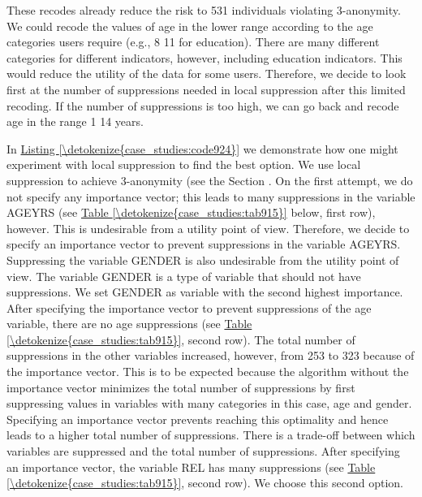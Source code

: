 \documentclass[letterpaper,10pt,english]{sphinxmanual}
\begin{document}
These recodes already reduce the risk to 531 individuals violating
3-anonymity. We could recode the values of age in the lower range
according to the age categories users require (e.g., 8 \textendash{} 11 for
education). There are many different categories for different
indicators, however, including education indicators. This would reduce
the utility of the data for some users. Therefore, we decide to look
first at the number of suppressions needed in local suppression after
this limited recoding. If the number of suppressions is too high, we can
go back and recode age in the range 1 \textendash{} 14 years.

In \hyperref[\detokenize{case_studies:code924}]{Listing \ref{\detokenize{case_studies:code924}}} we demonstrate how one might experiment with local
suppression to find the best option. We use local suppression to achieve
3-anonymity (see the Section  . On the first
attempt, we do not specify any importance vector; this leads to many
suppressions in the variable AGEYRS (see \hyperref[\detokenize{case_studies:tab915}]{Table \ref{\detokenize{case_studies:tab915}}} below, first row),
however. This is undesirable from a utility point of view. Therefore, we
decide to specify an importance vector to prevent suppressions in the
variable AGEYRS. Suppressing the variable GENDER is also undesirable
from the utility point of view. The variable GENDER is a type of
variable that should not have suppressions. We set GENDER as variable
with the second highest importance. After specifying the importance
vector to prevent suppressions of the age variable, there are no age
suppressions (see \hyperref[\detokenize{case_studies:tab915}]{Table \ref{\detokenize{case_studies:tab915}}}, second row). The total number of
suppressions in the other variables increased, however, from 253 to 323
because of the importance vector. This is to be expected because the
algorithm without the importance vector minimizes the total number of
suppressions by first suppressing values in variables with many
categories \textendash{} in this case, age and gender. Specifying an importance
vector prevents reaching this optimality and hence leads to a higher
total number of suppressions. There is a trade-off between which
variables are suppressed and the total number of suppressions. After
specifying an importance vector, the variable REL has many suppressions
(see \hyperref[\detokenize{case_studies:tab915}]{Table \ref{\detokenize{case_studies:tab915}}}, second row). We choose this second option.
\end{document}
